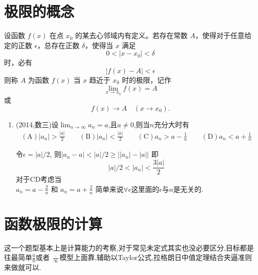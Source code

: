 \documentclass[12pt, a4paper, oneside, UTF8]{ctexbook}
\begin{document}
\section{极限的概念}
\begin{definition}[函数极限的定义]
    设函数 $f(x)$ 在点 $x_0$ 的某去心邻域内有定义。若存在常数 $A$，使得对于任意给定的正数 $\epsilon$，总存在正数 $\delta$，使得当 $x$ 满足
    \[
    0 < |x - x_0| < \delta
    \]
    时，必有
    \[
    |f(x) - A| < \epsilon
    \]
    则称 $A$ 为函数 $f(x)$ 当 $x$ 趋近于 $x_0$ 时的极限，记作
    \[
    \lim_{x \to x_0} f(x) = A
    \]
    或
    \[
    f(x) \to A \quad (x \to x_0).
    \]
\end{definition}
\begin{enumerate}[label=\arabic*.,start=3]
    \item  (2014,数三)设$\lim_{n\to\infty} a_n = a$,且$a \neq 0$,则当$n$充分大时有
    \begin{align*}
        (\text{A}) |a_n| > \frac{|a|}{2} \qquad
        (\text{B}) |a_n| < \frac{|a|}{2} \qquad
        (\text{C}) a_n > a - \frac{1}{n} \qquad
        (\text{D}) a_n < a + \frac{1}{n}
    \end{align*}
    
    \begin{solution}
    令$\epsilon = \left|a\right|/2$, 则$\left|a_n-a\right|< |a|/2 \geq \left| |a_n| - |a|\right|$ 
    即
    $$
        |a|/2 < |a_n| < \frac{ 3|a| }{2}
    $$
    对于CD考虑当 \\
    $a_n=a-\frac{2}{n}$ 和 $a_n=a+\frac{2}{n}$ 简单来说$\forall\epsilon$这里面的$\epsilon$与$n$是无关的.
    \end{solution}
\end{enumerate}

\section{函数极限的计算}
\begin{remark}
    这一个题型基本上是计算能力的考察,对于常见未定式其实也没必要区分,目标都是往最简单$\frac{0}{0}$或者
$\frac{\cdot}{\infty}$模型上面靠,辅助以Taylor公式,拉格朗日中值定理结合夹逼准则来做就可以.
\end{remark}
\end{document}
